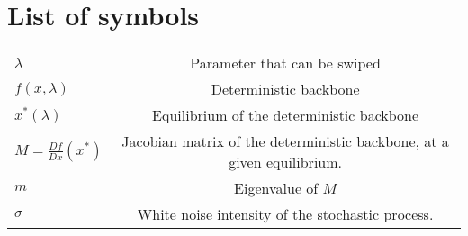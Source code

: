 \section{List of symbols}

\begin{tabular}{ l c}
	$\lambda$ & Parameter that can be swiped \\
	$ f(x,\lambda) $ & Deterministic backbone \\
	$x^*(\lambda)$  & Equilibrium of the deterministic backbone \\
	$M=\frac{D f}{D x}(x^*)$  & Jacobian matrix of the deterministic backbone, at a given equilibrium. \\
	$m$  & Eigenvalue of $M$ \\
	$\sigma$ & White noise intensity of the stochastic process. 
\end{tabular}



